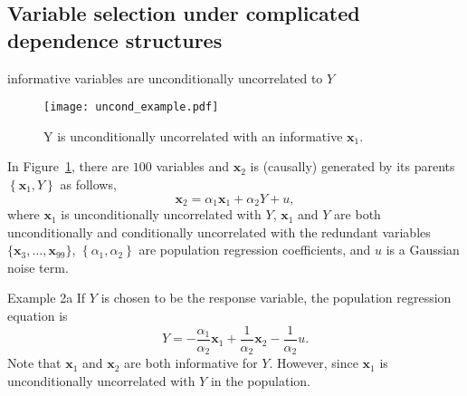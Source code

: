 \documentclass{beamer}
\begin{document}
\subsection{Variable selection under complicated dependence structures}

\begin{frame}{informative variables are unconditionally uncorrelated to $Y$}
  \begin{figure}[ht]
    \centering
    \texttt{[image: uncond\_example.pdf]}
    \caption{Y is unconditionally uncorrelated with an informative $\mathbf{x}_1$.}
    \label{fig:uncond_example}
  \end{figure}
  In Figure~\ref{fig:uncond_example}, there are $100$ variables and $\mathbf{x}_2$ is (causally) generated by its parents $\left\{ \mathbf{x}_1, Y \right\}$ as follows,
  \begin{equation}
    \mathbf{x}_2 = \alpha_1 \mathbf{x}_1 + \alpha_2 Y + u,
    \label{eqn:collider_1}
  \end{equation}
  where $\mathbf{x}_1$ is unconditionally uncorrelated with $Y$, $\mathbf{x}_1$ and $Y$ are both unconditionally and conditionally uncorrelated with the redundant variables $\{\mathbf{x}_3, \ldots, \mathbf{x}_{99}\}$, $\left\{\alpha_1, \alpha_2 \right\}$ are population regression coefficients, and $u$ is a Gaussian noise term.
\end{frame}

\begin{frame}{Example 2a}
   If $Y$ is chosen to be the response variable, the population regression equation is
  \begin{equation}
    Y = -\frac{\alpha_1}{\alpha_2} \mathbf{x}_1 + \frac{1}{\alpha_2} \mathbf{x}_2 - \frac{1}{\alpha_2}u.
    \label{eqn:collider_2}
  \end{equation}
  Note that $\mathbf{x}_1$ and $\mathbf{x}_2$ are both informative for $Y$. However, since $\mathbf{x}_1$ is unconditionally uncorrelated with $Y$ in the population.
\end{frame}
\end{document}
